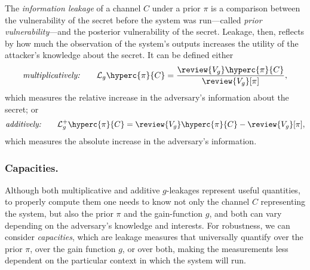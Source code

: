 The \emph{information leakage} of 
a channel $C$ under a prior $\pi$ is a comparison between 
the vulnerability of the secret before the system
was run---called \emph{prior vulnerability}---and the 
posterior vulnerability of the secret.
Leakage, then, reflects by how much the observation of the 
system's outputs increases the utility of the attacker's 
knowledge about the secret. 
It can be defined either
\begin{align*}
\textit{multiplicatively:} \qquad \mathcal{L}_{g}\hyperc{\pi}{C} = \frac{\review{V_g} \hyperc{\pi}{C}}{\review{V_g}[\pi]},
\end{align*}
which measures the relative increase in the adversary's information about the secret; or
\begin{align*}
\textit{additively:} \qquad \mathcal{L}^{+}_{g}\hyperc{\pi}{C} = \review{V_g}\hyperc{\pi}{C}-\review{V_g}[\pi],
\end{align*}
which measures the absolute increase in the adversary's information. 


\subsubsection{Capacities.}
Although both multiplicative and additive $g$-leakages represent useful 
quantities, to properly compute them one needs to know
not only the channel $C$ representing the system, but also the prior 
$\pi$ and the gain-function $g$, and both can vary depending on the adversary's 
knowledge and interests.
For robustness, we can consider \emph{capacities}, which are leakage 
measures that universally quantify over the prior $\pi$, over the gain 
function $g$, or over both, making the measurements less dependent on the
particular context in which the system will run. 

